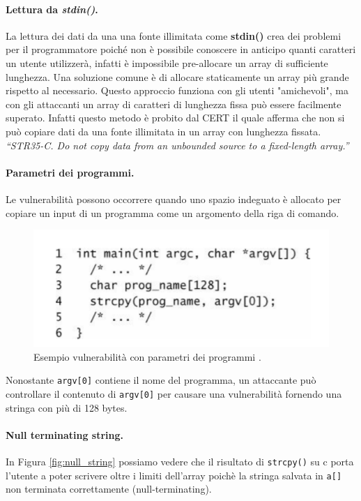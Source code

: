 \paragraph{Lettura da \textit{stdin()}.} La lettura dei dati da una una fonte illimitata come \textbf{stdin()} crea dei problemi per il programmatore poiché non è possibile conoscere in anticipo quanti caratteri un utente utilizzerà, infatti è impossibile pre-allocare un array di sufficiente lunghezza. Una soluzione comune è di allocare staticamente un array più grande rispetto al necessario. Questo approccio funziona con gli utenti "amichevoli", ma con gli attaccanti un array di caratteri di lunghezza fissa può essere facilmente superato. Infatti questo metodo è probito dal CERT il quale afferma che non si può copiare dati da una fonte illimitata in un array con lunghezza fissata.\\
\textit{“STR35-C. Do not copy data from an unbounded
source to a fixed-length array.”}
\paragraph{Parametri dei programmi.} Le vulnerabilità possono occorrere quando uno spazio indeguato è allocato per copiare un input di un programma come un argomento della riga di comando. 

\begin{figure}[H]
	\centering
    \includegraphics[width=14cm, keepaspectratio]{santini/img/cap_2/parametri_funzioni.png}
	\caption{Esempio vulnerabilità con parametri dei programmi .}\label{fig:parametri_programmi}
\end{figure}
Nonostante \verb|argv[0]| contiene il nome del programma, un attaccante può controllare il contenuto di \verb|argv[0]| per causare una vulnerabilità fornendo una stringa con più di 128 bytes.

\paragraph{Null terminating string.} In Figura \ref{fig:null_string} possiamo vedere che il risultato di \verb|strcpy()| su c porta l'utente a poter scrivere oltre i limiti dell'array poichè la stringa salvata in \verb|a[]| non terminata correttamente (null-terminating).



